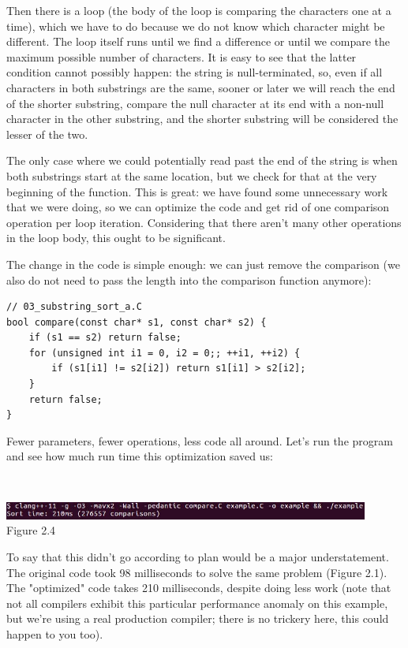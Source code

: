 Then there is a loop (the body of the loop is comparing the characters one at a time), which we have to do because we do not know which character might be different. The loop itself runs until we find a difference or until we compare the maximum possible number of characters. It is easy to see that the latter condition cannot possibly happen: the string is null-terminated, so, even if all characters in both substrings are the same, sooner or later we will reach the end of the shorter substring, compare the null character at its end with a non-null character in the other substring, and the shorter substring will be considered the lesser of the two.

The only case where we could potentially read past the end of the string is when both substrings start at the same location, but we check for that at the very beginning of the function. This is great: we have found some unnecessary work that we were doing, so we can optimize the code and get rid of one comparison operation per loop iteration. Considering that there aren't many other operations in the loop body, this ought to be significant.

The change in the code is simple enough: we can just remove the comparison (we also do not need to pass the length into the comparison function anymore):

\begin{lstlisting}[style=styleCXX]
// 03_substring_sort_a.C
bool compare(const char* s1, const char* s2) {
	if (s1 == s2) return false;
	for (unsigned int i1 = 0, i2 = 0;; ++i1, ++i2) {
		if (s1[i1] != s2[i2]) return s1[i1] > s2[i2];
	}
	return false;
}
\end{lstlisting}

Fewer parameters, fewer operations, less code all around. Let's run the program and see how much run time this optimization saved us:

\hspace*{\fill} \\ %
\begin{center}
\includegraphics[width=0.9\textwidth]{content/1/chapter2/images/4.jpg}\\
Figure 2.4
\end{center}

To say that this didn't go according to plan would be a major understatement. The original code took 98 milliseconds to solve the same problem (Figure 2.1). The "optimized" code takes 210 milliseconds, despite doing less work (note that not all compilers exhibit this particular performance anomaly on this example, but we're using a real production compiler; there is no trickery here, this could happen to you too).

